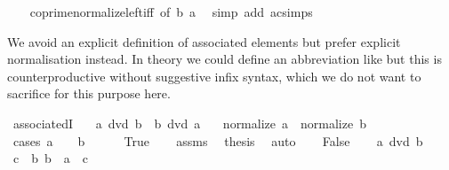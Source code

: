 \begin{isabellebody}
%
\isadelimproof
\ \ %
\endisadelimproof
%
\isatagproof
{}\isamarkupfalse%
\ coprime{\isacharunderscore}{\kern0pt}normalize{\isacharunderscore}{\kern0pt}left{\isacharunderscore}{\kern0pt}iff\ {\isacharbrackleft}{\kern0pt}of\ b\ a{\isacharbrackright}{\kern0pt}\ \isamarkupfalse%
\ {\isacharparenleft}{\kern0pt}simp\ add{\isacharcolon}{\kern0pt}\ ac{\isacharunderscore}{\kern0pt}simps{\isacharparenright}{\kern0pt}%
\endisatagproof
{\isafoldproof}%
%
\isadelimproof
%
\endisadelimproof
%
\begin{isamarkuptext}%
We avoid an explicit definition of associated elements but prefer explicit
  normalisation instead. In theory we could define an abbreviation like  but this is counterproductive
  without suggestive infix syntax, which we do not want to sacrifice for this
  purpose here.%
\end{isamarkuptext}\isamarkuptrue%
\isamarkupfalse%
\ associatedI{\isacharcolon}{\kern0pt}\isanewline
\ \ \ {\isachardoublequoteopen}a\ dvd\ b{\isachardoublequoteclose}\ \ {\isachardoublequoteopen}b\ dvd\ a{\isachardoublequoteclose}\isanewline
\ \ \ {\isachardoublequoteopen}normalize\ a\ {\isacharequal}{\kern0pt}\ normalize\ b{\isachardoublequoteclose}\isanewline
%
\isadelimproof
%
\endisadelimproof
%
\isatagproof
{}\isamarkupfalse%
\ {\isacharparenleft}{\kern0pt}cases\ {\isachardoublequoteopen}a\ {\isacharequal}{\kern0pt}\ {}\ {\isasymor}\ b\ {\isacharequal}{\kern0pt}\ {}{\isachardoublequoteclose}{\isacharparenright}{\kern0pt}\isanewline
\ \ \isamarkupfalse%
\ True\isanewline
\ \ \isamarkupfalse%
\ assms\ \isamarkupfalse%
\ {\isacharquery}{\kern0pt}thesis\ \isamarkupfalse%
\ auto\isanewline
{}\isamarkupfalse%
\isanewline
\ \ \isamarkupfalse%
\ False\isanewline
\ \ \isamarkupfalse%
\ {\isacartoucheopen}a\ dvd\ b{\isacartoucheclose}\ \isamarkupfalse%
\ c\ \ b{\isacharcolon}{\kern0pt}\ {\isachardoublequoteopen}b\ {\isacharequal}{\kern0pt}\ a\ {\isacharasterisk}{\kern0pt}\ c{\isachardoublequoteclose}\ \isacommand{{\isachardot}{\kern0pt}{\isachardot}{\kern0pt}}\isamarkupfalse%
\isanewline
\ \ \isamarkupfalse%
\ \isamarkupfalse%

\end{isabellebody}
